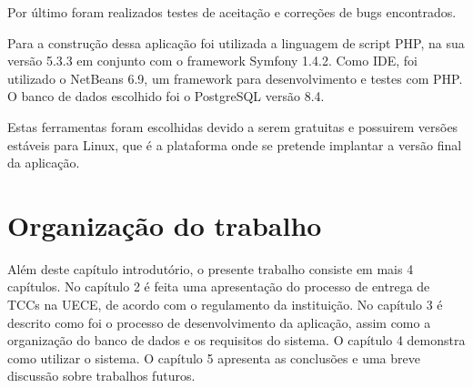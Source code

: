 Por último foram realizados testes de aceitação e correções de bugs encontrados.

Para a construção dessa aplicação foi utilizada a linguagem de script PHP, na 
sua versão 5.3.3 em conjunto com o framework Symfony 1.4.2. Como IDE, foi utilizado 
o NetBeans 6.9, um framework para desenvolvimento e testes com PHP. O 
banco de dados escolhido foi o PostgreSQL versão 8.4.

Estas ferramentas foram escolhidas devido a serem gratuitas e possuirem versões 
estáveis para Linux, que é a plataforma onde se pretende implantar a versão 
final da aplicação.

\section{Organização do trabalho}

Além deste capítulo introdutório, o presente trabalho consiste em mais 4 capítulos. 
No capítulo 2 é feita uma apresentação do processo de entrega de TCCs na UECE, de acordo
com o regulamento da instituição. No capítulo 3 é descrito como foi o processo de desenvolvimento 
da aplicação, assim como a organização do banco de dados e os requisitos do sistema. 
O capítulo 4 demonstra como utilizar o sistema. O capítulo 5 apresenta as conclusões
e uma breve discussão sobre trabalhos futuros.

